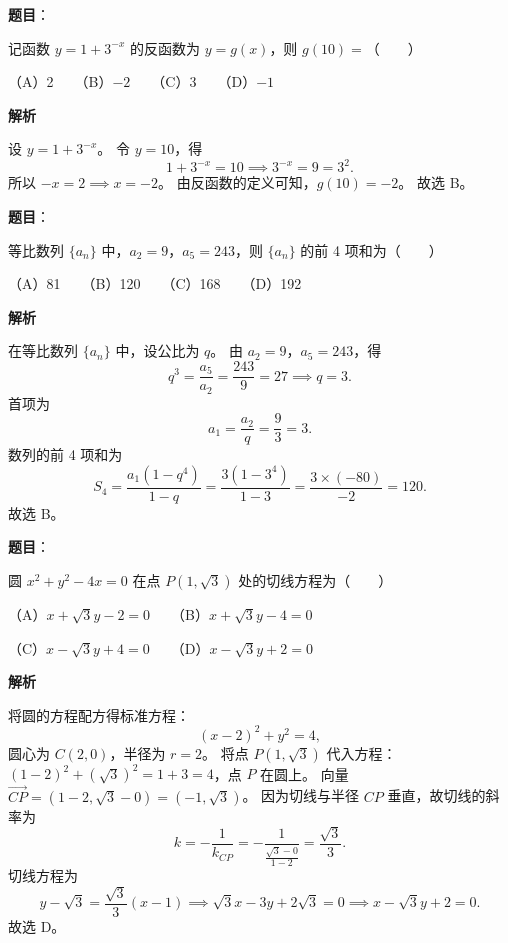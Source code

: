\begin{answer}

\textbf{题目}：

记函数 $y=1+3^{-x}$ 的反函数为 $y=g(x)$，则 $g(10)=$\mbox{（　　）}

（A）2　　（B）$-2$　　（C）3　　（D）$-1$

\textbf{解析}

设 $y=1+3^{-x}$。
令 $y=10$，得
\nopagebreak[4]
\[
1+3^{-x}=10 \implies 3^{-x}=9=3^2.
\]
所以 $-x=2 \implies x=-2$。
由反函数的定义可知，$g(10)=-2$。
故选 B。


\end{answer}
\begin{answer}

\textbf{题目}：

等比数列 $\{a_n\}$ 中，$a_2=9$，$a_5=243$，则 $\{a_n\}$ 的前 4 项和为\mbox{（　　）}

（A）81　　（B）120　　（C）168　　（D）192

\textbf{解析}

在等比数列 $\{a_n\}$ 中，设公比为 $q$。
由 $a_2=9$，$a_5=243$，得
\nopagebreak[4]
\[
q^3=\frac{a_5}{a_2}=\frac{243}{9}=27 \implies q=3.
\]
首项为
\nopagebreak[4]
\[
a_1=\frac{a_2}{q}=\frac{9}{3}=3.
\]
数列的前 4 项和为
\nopagebreak[4]
\[
S_4=\frac{a_1(1-q^4)}{1-q}=\frac{3(1-3^4)}{1-3}=\frac{3\times(-80)}{-2}=120.
\]
故选 B。


\end{answer}
\begin{answer}

\textbf{题目}：

圆 $x^2+y^2-4x=0$ 在点 $P(1,\sqrt{3})$ 处的切线方程为\mbox{（　　）}

（A）$x+\sqrt{3}y-2=0$　　（B）$x+\sqrt{3}y-4=0$

（C）$x-\sqrt{3}y+4=0$　　（D）$x-\sqrt{3}y+2=0$

\textbf{解析}

将圆的方程配方得标准方程：
\nopagebreak[4]
\[
(x-2)^2+y^2=4,
\]
圆心为 $C(2,0)$，半径为 $r=2$。
将点 $P(1,\sqrt{3})$ 代入方程：$(1-2)^2+(\sqrt{3})^2=1+3=4$，点 $P$ 在圆上。
向量 $\overrightarrow{CP}=(1-2,\sqrt{3}-0)=(-1,\sqrt{3})$。
因为切线与半径 $CP$ 垂直，故切线的斜率为
\nopagebreak[4]
\[
k=-\frac{1}{k_{CP}}=-\frac{1}{\frac{\sqrt{3}-0}{1-2}}=\frac{\sqrt{3}}{3}.
\]
切线方程为
\nopagebreak[4]
\[
y-\sqrt{3}=\frac{\sqrt{3}}{3}(x-1) \implies \sqrt{3}x-3y+2\sqrt{3}=0 \implies x-\sqrt{3}y+2=0.
\]
故选 D。


\end{answer}
